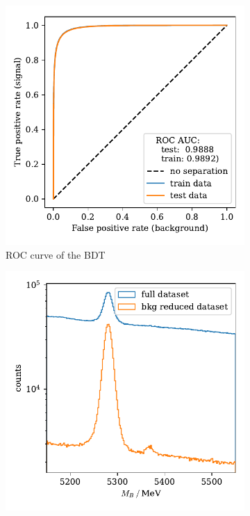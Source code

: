 \begin{figure}
    \centering
    \begin{subfigure}{0.5\textwidth}
        \centering
        \includegraphics[width=\textwidth]{images/BKG_BDT_ROC.pdf}
        \caption{ROC curve of the BDT}
        \label{fig:BKG_BDT_ROC}
    \end{subfigure}%
    \begin{subfigure}{0.5\textwidth}
        \centering
        \includegraphics[width=\textwidth]{images/BKG_reduced.pdf}

\end{subfigure}
\end{figure}
